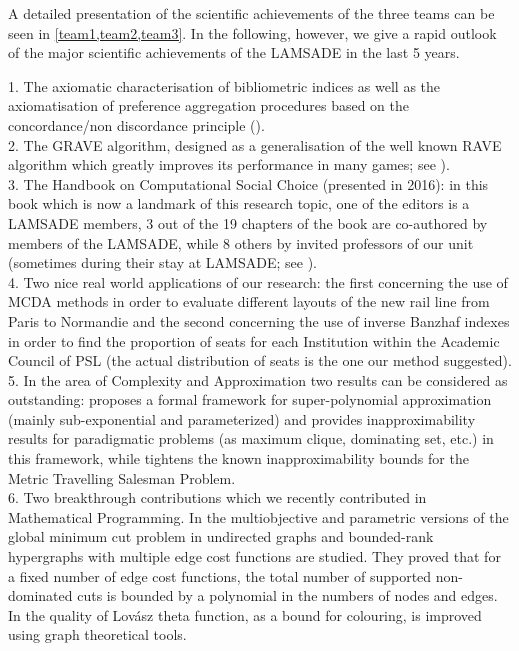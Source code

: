 A detailed presentation of the scientific achievements of the three teams can be seen in \cref{team1,team2,team3}. In the following, however, we give a rapid outlook of the major scientific achievements of the LAMSADE in the last 5 years.

\vspace{5mm}

1. The axiomatic characterisation of bibliometric indices as well as the axiomatisation of preference aggregation procedures based on the concordance/non discordance principle (\cite{Bouyssou2015A-634565}). \\
2. The GRAVE algorithm, designed as a generalisation of the well known RAVE algorithm which greatly improves its performance in many games; see \cite{Cazenave2015Generalized-1222829}). \\
3. The Handbook on Computational Social Choice (presented in 2016): in this book which is now a landmark of this research topic, one of the editors is a LAMSADE members, 3 out of the 19 chapters of the book are co-authored by members of the LAMSADE, while 8 others by invited professors of our unit (sometimes during their stay at LAMSADE; see \cite{HBCOMSOC2016}). \\
4. Two nice real world applications of our research: the first concerning the use of MCDA methods in order to evaluate different layouts of the new rail line from Paris to Normandie and the second concerning the use of inverse Banzhaf indexes in order to find the proportion of seats for each Institution within the Academic Council of PSL (the actual distribution of seats is the one our method suggested). \\
5. In the area of Complexity and Approximation two results can be considered as outstanding: \cite{DBLP:journals/algorithmica/BonnetE0P15} proposes a formal framework for super-polynomial approximation (mainly sub-exponential and parameterized) and provides inapproximability results for paradigmatic problems (as maximum clique, dominating set, etc.) in this framework, while \cite{Karpinski2015New-1298222} tightens the known inapproximability bounds for the Metric Travelling Salesman Problem. \\
6. Two breakthrough contributions which we recently contributed in Mathematical Programming. In \cite{DBLP:journals/mp/AissiMMQ15} the multiobjective and parametric versions of the global minimum cut problem in undirected graphs and bounded-rank hypergraphs with multiple edge cost functions are studied. They proved that for a fixed number of edge cost functions, the total number of supported non-dominated cuts is bounded by a polynomial in the numbers of nodes and edges. In \cite{Cornaz2014Chromatic-623556} the quality of Lov\'asz theta function, as a bound for colouring, is improved using graph theoretical tools. \\
